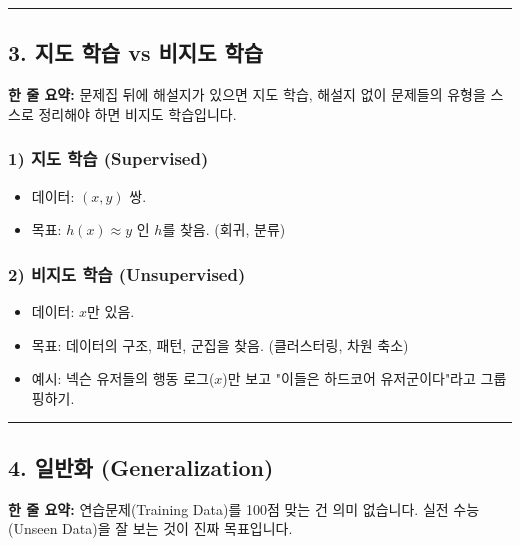 \documentclass[11pt,a4paper]{book}
\theoremstyle{definition}
\begin{document}
\vspace{0.5cm}\hrule\vspace{0.5cm}

\subsection{3. 지도 학습 vs 비지도 학습}

\begin{conceptbox}[title={개념 3: 정답지의 유무}]
\textbf{한 줄 요약:} 문제집 뒤에 해설지가 있으면 지도 학습, 해설지 없이 문제들의 유형을 스스로 정리해야 하면 비지도 학습입니다.
\end{conceptbox}

\subsubsection*{1) 지도 학습 (Supervised)}
\begin{itemize}
    \item 데이터: $(x, y)$ 쌍.
    \item 목표: $h(x) \approx y$ 인 $h$를 찾음. (회귀, 분류)
\end{itemize}

\subsubsection*{2) 비지도 학습 (Unsupervised)}
\begin{itemize}
    \item 데이터: $x$만 있음.
    \item 목표: 데이터의 구조, 패턴, 군집을 찾음. (클러스터링, 차원 축소)
    \item 예시: 넥슨 유저들의 행동 로그($x$)만 보고 "이들은 하드코어 유저군이다"라고 그룹핑하기.
\end{itemize}

\vspace{0.5cm}\hrule\vspace{0.5cm}

\subsection{4. 일반화 (Generalization)}


\begin{conceptbox}[title={개념 4: 머신러닝의 존재 이유}]
\textbf{한 줄 요약:} 연습문제(Training Data)를 100점 맞는 건 의미 없습니다. 실전 수능(Unseen Data)을 잘 보는 것이 진짜 목표입니다.
\end{conceptbox}
\end{document}
